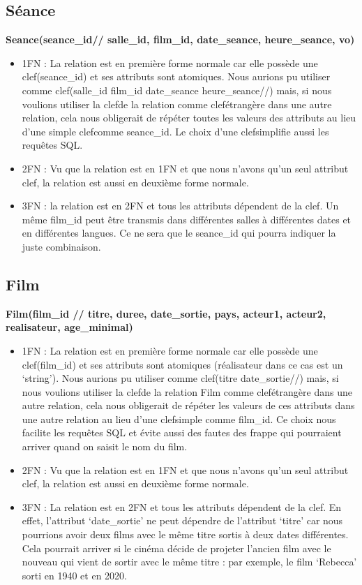 \documentclass[12pt]{article}
\begin{document}
\subsection{Séance}
\textbf{Seance(seance{\_}id//  salle{\_}id, film{\_}id, date{\_}seance, heure{\_}seance, vo)}
\begin{itemize}
    \item 1FN : La relation est en première forme normale car elle 
    possède une clef(seance{\_}id) et ses attributs sont atomiques. 
    Nous aurions pu utiliser comme clef(salle{\_}id film{\_}id date{\_}seance heure{\_}seance//) 
    mais, si nous voulions utiliser la clefde la relation comme clefétrangère dans une autre relation, 
    cela nous obligerait de répéter toutes les valeurs des attributs au lieu 
    d’une simple clefcomme seance{\_}id. Le choix d’une clefsimplifie aussi les requêtes SQL. 
    \item 2FN : Vu que la relation est en 1FN et que nous n'avons qu'un seul attribut clef, la relation est aussi
    en deuxième forme normale.
    \item 3FN : la relation est en 2FN et tous les attributs dépendent de la clef. Un même film{\_}id peut 
    être transmis dans différentes salles à différentes dates et en 
    différentes langues. Ce ne sera que le seance{\_}id qui pourra indiquer la juste combinaison. 
\end{itemize}
\pagebreak
\subsection{Film}
\textbf{Film(film{\_}id // titre, duree, date{\_}sortie, pays, acteur1, acteur2, realisateur, age{\_}minimal)}
\begin{itemize}
    \item 1FN : La relation est en première forme normale car elle possède une clef(film{\_}id) et 
    ses attributs sont atomiques (réalisateur dans ce cas est un ‘string’). Nous aurions pu utiliser 
    comme clef(titre date{\_}sortie//) mais, si nous voulions utiliser la clefde la relation Film comme 
    clefétrangère dans une autre relation, cela nous obligerait de répéter les valeurs de ces attributs dans 
    une autre relation au lieu d’une clefsimple comme film{\_}id. Ce choix nous 
    facilite les requêtes SQL et évite aussi des fautes des frappe qui pourraient arriver quand on saisit le nom du film. 
    \item 2FN : Vu que la relation est en 1FN et que nous n'avons qu'un seul attribut clef, la relation est aussi
    en deuxième forme normale.
    \item 3FN : La relation est en 2FN et tous les attributs dépendent de la clef. 
    En effet, l’attribut ‘date{\_}sortie’ ne peut dépendre de l’attribut ‘titre’ 
    car nous pourrions avoir deux films avec le même titre sortis à deux dates différentes. 
    Cela pourrait arriver si le cinéma décide de projeter l’ancien film avec le nouveau 
    qui vient de sortir avec le même titre : 
    par exemple, le film ‘Rebecca’ sorti en 1940 et en 2020.
\end{itemize}
\end{document}
